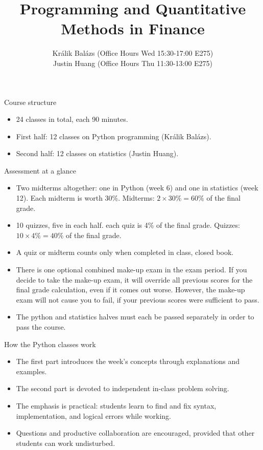 \documentclass[aspectratio=169,11pt]{beamer}
\title{Programming and Quantitative Methods in Finance}
\subtitle{Králik Balázs (Office Hours Wed 15:30-17:00 E275) \\
Justin Huang (Office Hours Thu 11:30-13:00 E275)}
\author{}
\date{}
\begin{document}
\titleandoutline


\begin{frame}{Course structure}
  \begin{itemize}
    \item 24 classes in total, each 90 minutes.
    \item First half: 12 classes on Python programming (Králik Balázs).
    \item Second half: 12 classes on statistics (Justin Huang).
  \end{itemize}
\end{frame}


\begin{frame}{Assessment at a glance}
  \begin{itemize}
    \item Two midterms altogether: one in Python (week 6) and one in statistics (week 12). Each midterm is worth 30\%. Midterms: $2 \times 30\% = 60\%$ of the final grade.
    \item 10 quizzes, five in each half. each quiz is 4\% of the final grade. Quizzes: $10 \times 4\% = 40\%$ of the final grade.
    \item A quiz or midterm counts only when completed in class, closed book.
    \item There is one optional combined make-up exam in the exam period. If you decide to take the make-up exam, it will override all previous scores for the final grade calculation, even if it comes out worse. However, the make-up exam will not cause you to fail, if your previous scores were sufficient to pass.
    \item The python and statistics halves must each be passed separately in order to pass the course.
  \end{itemize}
\end{frame}


\begin{frame}{How the Python classes work}
  \begin{itemize}
    \item The first part introduces the week's concepts through explanations
          and examples.
    \item The second part is devoted to independent in-class problem solving.
    \item The emphasis is practical: students learn to find and fix syntax,
          implementation, and logical errors while working.
    \item Questions and productive collaboration are encouraged, provided that
          other students can work undisturbed.
  \end{itemize}
\end{frame}
\end{document}
